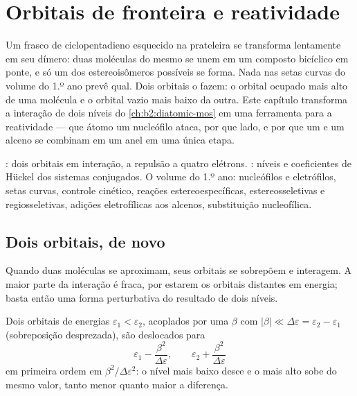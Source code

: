 \chapter{Orbitais de fronteira e reatividade}\label{ch:b2:frontier-orbitals}

Um frasco de ciclopentadieno esquecido na prateleira se transforma lentamente
em seu dímero: duas moléculas do mesmo  se unem em um composto bicíclico
em ponte, e só um dos estereoisômeros possíveis se forma. Nada nas setas
curvas do volume do 1.º ano prevê qual. Dois orbitais o fazem: o orbital
ocupado mais alto de uma molécula e o orbital vazio mais baixo da outra. Este
capítulo transforma a interação de dois níveis do \cref{ch:b2:diatomic-mos} em
uma ferramenta para a reatividade --- que átomo um nucleófilo ataca, por que
lado, e por que um  e um alceno se combinam em um anel em uma única
etapa.

\begin{recall}
: dois orbitais em interação, a repulsão a quatro
elétrons. : níveis e coeficientes de Hückel dos sistemas
conjugados. O volume do 1.º ano: nucleófilos e eletrófilos, setas curvas,
controle cinético, reações estereoespecíficas, estereosseletivas e
regiosseletivas, adições eletrofílicas aos alcenos, substituição nucleofílica.
\end{recall}

\section{Dois orbitais, de novo}

Quando duas moléculas se aproximam, seus orbitais se sobrepõem e interagem. A
maior parte da interação é fraca, por estarem os orbitais distantes em
energia; basta então uma forma perturbativa do resultado de dois níveis.

\begin{theorem}\label{thm:b2:frontier-orbitals:perturbation}
Dois orbitais de energias $\varepsilon_1 < \varepsilon_2$, acoplados por uma  $\beta$ com $|\beta| \ll \Delta\varepsilon = \varepsilon_2 - \varepsilon_1$
(sobreposição desprezada), são deslocados para
\[
  \varepsilon_1 - \frac{\beta^2}{\Delta\varepsilon}, \qquad \varepsilon_2 + \frac{\beta^2}{\Delta\varepsilon}
\]
em primeira ordem em $\beta^2/\Delta\varepsilon^2$: o nível mais baixo desce e o mais alto
sobe do mesmo valor, tanto menor quanto maior a diferença.
\end{theorem}

